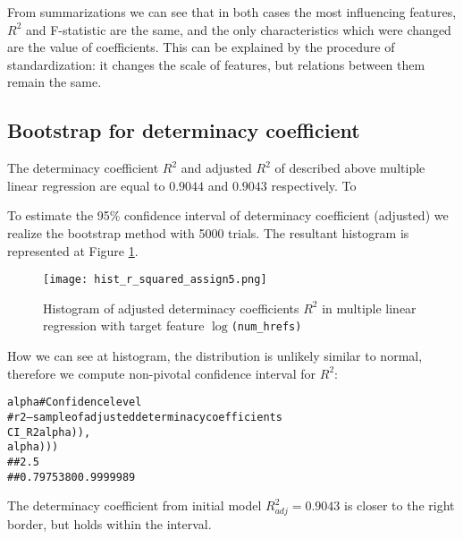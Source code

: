 From summarizations we can see that in both cases the most influencing features, $R^2$ and F-statistic are the same, and the only characteristics which were changed are the value of coefficients. This can be explained by the procedure of standardization: it changes the scale of features, but relations between them remain the same.

\subsection{Bootstrap for determinacy coefficient}
The determinacy coefficient $R^2$ and adjusted $R^2$ of described above multiple linear regression are equal to $0.9044$ and $0.9043$ respectively. To 

To estimate the 95\%  confidence interval of determinacy coefficient (adjusted) we realize the bootstrap method with 5000 trials. The resultant histogram is represented at Figure \ref{fig:hist_r_squared_bootstrap_assign5}. 

\begin{figure}[h!]
 \begin{center}
    \center \texttt{[image: hist\_r\_squared\_assign5.png]}
   \caption{Histogram of adjusted determinacy coefficients $R^2$ in multiple linear regression with target feature \texttt{$\log$(num\_hrefs)}}
   \label{fig:hist_r_squared_bootstrap_assign5}
 \end{center}
\end{figure} 

How we can see at histogram, the distribution is unlikely similar to normal, therefore we compute non-pivotal confidence interval for $R^2$:
\begin{knitrout}
\color{fgcolor}\begin{kframe}
\begin{alltt}
alpha \hlkwb{<-}  # Confidence level
# r2 --- sample of adjusted determinacy coefficients
CI_R2 \hlkwb{<-} \hlstd{(}\hlstd{ = (} \hlopt{-} alpha)\hlopt{/}), 
            \hlstd{= (} \hlopt{+} alpha)\hlopt{/}))
##      2.5%     97.5% 
## 0.7975380 0.9999989 
\end{alltt}
\end{kframe}
\end{knitrout}

The determinacy coefficient from initial model $R^2_{adj} = 0.9043$ is closer to the right border, but holds within the interval. 

